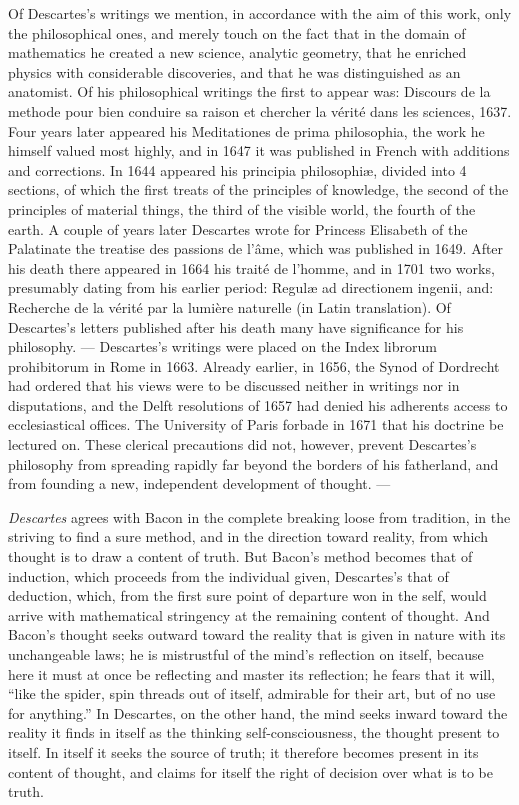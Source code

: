 Of Descartes's writings we mention, in accordance with the aim of this work, only the philosophical ones, and merely touch on the fact that in the domain of mathematics he created a new science, analytic geometry, that he enriched physics with considerable discoveries, and that he was distinguished as an anatomist. Of his philosophical writings the first to appear was: Discours de la methode pour bien conduire sa raison et chercher la vérité dans les sciences, 1637. Four years later appeared his Meditationes de prima philosophia, the work he himself valued most highly, and in 1647 it was published in French with additions and corrections. In 1644 appeared his principia philosophiæ, divided into 4 sections, of which the first treats of the principles of knowledge, the second of the principles of material things, the third of the visible world, the fourth of the earth. A couple of years later Descartes wrote for Princess Elisabeth of the Palatinate the treatise des passions de l'âme, which was published in 1649. After his death there appeared in 1664 his traité de l'homme, and in 1701 two works, presumably dating from his earlier period: Regulæ ad directionem ingenii, and: Recherche de la vérité par la lumière naturelle (in Latin translation). Of Descartes's letters published after his death many have significance for his philosophy. --- Descartes's writings were placed on the Index librorum prohibitorum in Rome in 1663. Already earlier, in 1656, the Synod of Dordrecht had ordered that his views were to be discussed neither in writings nor in disputations, and the Delft resolutions of 1657 had denied his adherents access to ecclesiastical offices. The University of Paris forbade in 1671 that his doctrine be lectured on. These clerical precautions did not, however, prevent Descartes's philosophy from spreading rapidly far
beyond the borders of his fatherland, and from founding a new, independent development of thought. ---

\divrule

\emph{Descartes} agrees with Bacon in the complete breaking loose from tradition, in the striving to find a sure method, and in the direction toward reality, from which thought is to draw a content of truth. But Bacon's method becomes that of induction, which proceeds from the individual given, Descartes's that of deduction, which, from the first sure point of departure won in the self, would arrive with mathematical stringency at the remaining content of thought. And Bacon's thought seeks outward toward the reality that is given in nature with its unchangeable laws; he is mistrustful of the mind's reflection on itself, because here it must at once be reflecting and master its reflection; he fears that it will, ``like the spider, spin threads out of itself, admirable for their art, but of no use for anything.'' In Descartes, on the other hand, the mind seeks inward toward the reality it finds in itself as the thinking self-consciousness, the thought present to itself. In itself it seeks the source of truth; it therefore becomes present in its content of thought, and claims for itself the right of decision over what is to be truth.

